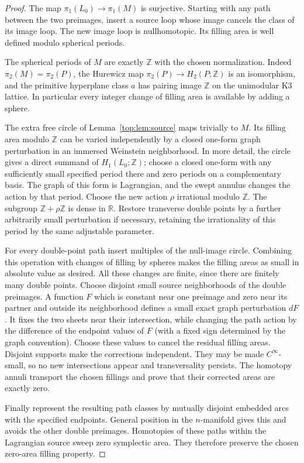 \documentclass[11pt]{article}
\numberwithin{equation}{section}
\theoremstyle{definition}
\theoremstyle{remark}
\begin{document}
\begin{proof}
The map $\pi_1(L_0)\to\pi_1(M)$ is surjective.  Starting with any
path between the two preimages, insert a source loop whose image
cancels the class of its image loop.  The new image loop is
nullhomotopic.  Its filling area is well defined modulo spherical
periods.

The spherical periods of $M$ are exactly $\mathbb Z$ with the chosen
normalization.  Indeed $\pi_2(M)=\pi_2(P)$, the Hurewicz map
$\pi_2(P)\to H_2(P;\mathbb Z)$ is an isomorphism, and the primitive
hyperplane class $a$ has pairing image $\mathbb Z$ on the unimodular K3
lattice.  In particular every integer change of filling area is
available by adding a sphere.

The extra free circle of Lemma~\ref{top:lem:source} maps trivially to
$M$.  Its filling area modulo $\mathbb Z$ can be varied independently by a
closed one-form graph perturbation in an immersed Weinstein
neighborhood.  In more detail, the circle gives a direct summand of
$H_1(L_0;\mathbb Z)$; choose a closed one-form with any sufficiently small
specified period there and zero periods on a complementary basis.
The graph of this form is Lagrangian, and the swept annulus changes
the action by that period.  Choose the new action $\rho$ irrational
modulo $\mathbb Z$.  The subgroup $\mathbb Z+\rho\mathbb Z$ is dense in $\mathbb R$.
Restore transverse double points by a further arbitrarily small
perturbation if necessary, retaining the irrationality of this
period by the same adjustable parameter.

For every double-point path insert multiples of the null-image
circle.  Combining this operation with changes of filling by spheres
makes the filling areas as small in absolute value as desired.  All
these changes are finite, since there are finitely many double
points.  Choose disjoint small source neighborhoods of the double
preimages.  A function $F$ which is constant near one preimage and
zero near its partner and outside its neighborhood defines a small
exact graph perturbation $dF$.  It fixes the two sheets near their
intersection, while changing the path action by the difference of
the endpoint values of $F$ (with a fixed sign determined by the
graph convention).  Choose these values to cancel the residual
filling areas.  Disjoint supports make the corrections independent.
They may be made $C^\infty$-small, so no new intersections appear and
transversality persists.  The homotopy annuli transport the chosen
fillings and prove that their corrected areas are exactly zero.

Finally represent the resulting path classes by mutually disjoint
embedded arcs with the specified endpoints.  General position in
the $n$-manifold gives this and avoids the other double preimages.
Homotopies of these paths within the Lagrangian source sweep zero
symplectic area.  They therefore preserve the chosen zero-area
filling property.
\end{proof}
\end{document}
